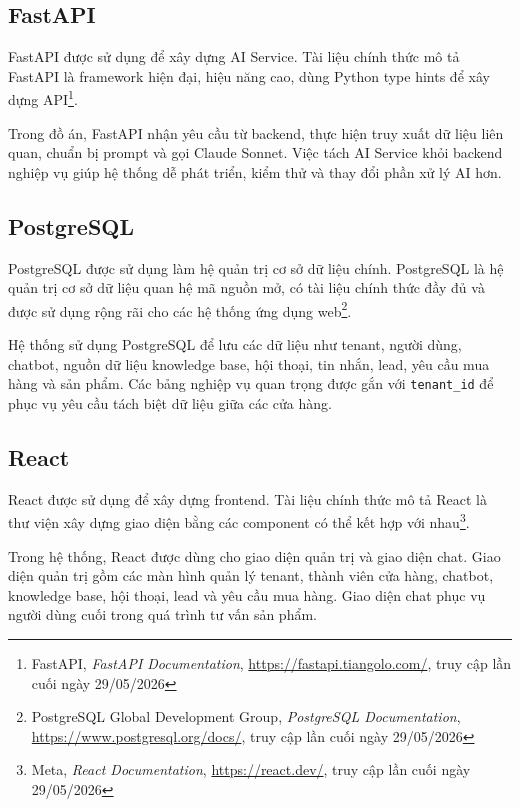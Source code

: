 \documentclass[../DoAn.tex]{subfiles}
\begin{document}
\subsection{FastAPI}
\label{subsection:3.2.3}

FastAPI được sử dụng để xây dựng AI Service. Tài liệu chính thức mô tả FastAPI là framework hiện đại, hiệu năng cao, dùng Python type hints để xây dựng API\footnote{FastAPI, \textit{FastAPI Documentation}, \url{https://fastapi.tiangolo.com/}, truy cập lần cuối ngày 29/05/2026}.

Trong đồ án, FastAPI nhận yêu cầu từ backend, thực hiện truy xuất dữ liệu liên quan, chuẩn bị prompt và gọi Claude Sonnet. Việc tách AI Service khỏi backend nghiệp vụ giúp hệ thống dễ phát triển, kiểm thử và thay đổi phần xử lý AI hơn.

\subsection{PostgreSQL}
\label{subsection:3.2.4}

PostgreSQL được sử dụng làm hệ quản trị cơ sở dữ liệu chính. PostgreSQL là hệ quản trị cơ sở dữ liệu quan hệ mã nguồn mở, có tài liệu chính thức đầy đủ và được sử dụng rộng rãi cho các hệ thống ứng dụng web\footnote{PostgreSQL Global Development Group, \textit{PostgreSQL Documentation}, \url{https://www.postgresql.org/docs/}, truy cập lần cuối ngày 29/05/2026}.

Hệ thống sử dụng PostgreSQL để lưu các dữ liệu như tenant, người dùng, chatbot, nguồn dữ liệu knowledge base, hội thoại, tin nhắn, lead, yêu cầu mua hàng và sản phẩm. Các bảng nghiệp vụ quan trọng được gắn với \texttt{tenant\_id} để phục vụ yêu cầu tách biệt dữ liệu giữa các cửa hàng.

\subsection{React}
\label{subsection:3.2.5}

React được sử dụng để xây dựng frontend. Tài liệu chính thức mô tả React là thư viện xây dựng giao diện bằng các component có thể kết hợp với nhau\footnote{Meta, \textit{React Documentation}, \url{https://react.dev/}, truy cập lần cuối ngày 29/05/2026}.

Trong hệ thống, React được dùng cho giao diện quản trị và giao diện chat. Giao diện quản trị gồm các màn hình quản lý tenant, thành viên cửa hàng, chatbot, knowledge base, hội thoại, lead và yêu cầu mua hàng. Giao diện chat phục vụ người dùng cuối trong quá trình tư vấn sản phẩm.
\end{document}
